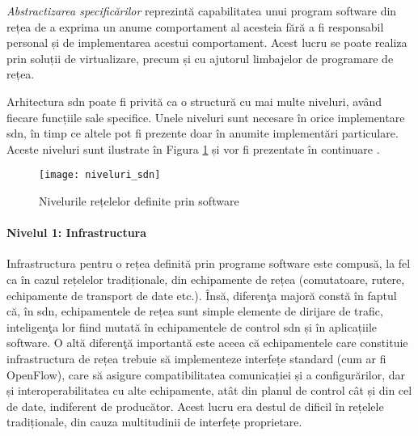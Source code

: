 \textit{Abstractizarea specificărilor} reprezintă capabilitatea unui program software din rețea de a exprima un anume comportament al acesteia fără a fi responsabil personal și de implementarea acestui comportament. Acest lucru se poate realiza prin soluții de virtualizare, precum și cu ajutorul limbajelor de programare de rețea.

Arhitectura \gls{sdn} poate fi privită ca o structură cu mai multe niveluri, având fiecare funcțiile sale specifice. Unele niveluri sunt necesare în orice implementare \gls{sdn}, în timp ce altele pot fi prezente doar în anumite implementări particulare. Aceste niveluri sunt ilustrate în Figura \ref{fig:niveluri_sdn} și vor fi prezentate în continuare \cite{kreutz2015software}.

\begin{figure}[h]
	\centering
	\texttt{[image: niveluri\_sdn]}
	\caption{Nivelurile rețelelor definite prin software}
	\label{fig:niveluri_sdn}
\end{figure}


\paragraph{Nivelul 1: Infrastructura}

Infrastructura pentru o rețea definită prin programe software este compusă, la fel ca în cazul rețelelor tradiționale, din echipamente de rețea (comutatoare, rutere, echipamente de transport de date etc.). Însă, diferenţa majoră constă în faptul că, în \gls{sdn}, echipamentele de rețea sunt simple elemente de dirijare de trafic, inteligenţa lor fiind mutată în echipamentele de control \gls{sdn} și în aplicațiile software. O altă diferenţă importantă este aceea că echipamentele care constituie infrastructura de rețea trebuie să implementeze interfețe standard (cum ar fi OpenFlow), care să asigure compatibilitatea comunicației și a configurărilor, dar și interoperabilitatea cu alte echipamente, atât din planul de control cât și din cel de date, indiferent de producător. Acest lucru era destul de dificil în rețelele tradiționale, din cauza multitudinii de interfețe proprietare.

